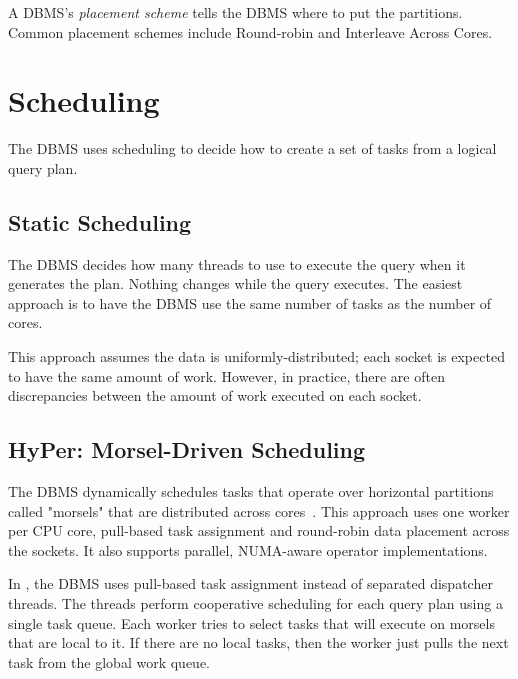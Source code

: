 \documentclass[11pt]{article}
\begin{document}
A DBMS's \textit{placement scheme} tells the DBMS where to put the partitions. Common 
placement schemes include Round-robin and Interleave Across Cores.

\section{Scheduling}
The DBMS uses scheduling to decide how to create a set of tasks from a logical query plan.

\subsection*{Static Scheduling}
The DBMS decides how many threads to use to execute the query when it generates the plan. 
Nothing changes while the query executes. The easiest approach is to have the DBMS use the same 
number of tasks as the number of cores.

This approach assumes the data is uniformly-distributed; each socket is expected to have the 
same amount of work. However, in practice, there are often discrepancies between the amount of work 
executed on each socket.

\subsection*{HyPer: Morsel-Driven Scheduling}
The DBMS dynamically schedules tasks that operate over horizontal partitions called "morsels" that 
are distributed across cores~\cite{Leis2014}. This approach uses one worker per CPU 
core, pull-based task assignment and round-robin data placement across the sockets. It also supports 
parallel, NUMA-aware operator implementations.

In , the DBMS uses pull-based task assignment instead of separated dispatcher 
threads. The threads perform cooperative scheduling for each query plan using a single task queue. 
Each worker tries to select tasks that will execute on morsels that are local to it. If there are 
no local tasks, then the worker just pulls the next task from the global work queue.
\end{document}
